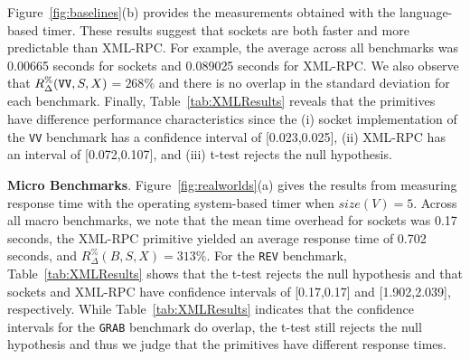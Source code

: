 \documentclass{sig-alternate}
\begin{document}

\sloppy Figure~\ref{fig:baselines}(b) provides the measurements
obtained with the language-based timer.  These results suggest that
sockets are both faster and more predictable than XML-RPC.  For
example, the average across all benchmarks was 0.00665 seconds for
sockets and 0.089025 seconds for XML-RPC.  We also observe that
{\small $R_\Delta^\%(\mbox{{\tt VV}},S,X)$}$=268\%$ and there is no
overlap in the standard deviation for each benchmark.  Finally,
Table~\ref{tab:XMLResults} reveals that the primitives have difference
performance characteristics since the (i) socket implementation of the
\texttt{VV} benchmark has a confidence interval of [0.023,0.025], (ii)
XML-RPC has an interval of [0.072,0.107], and (iii) t-test rejects the
null hypothesis.








{\bf Micro Benchmarks}. Figure~\ref{fig:realworlds}(a) gives the
results from measuring response time with the operating system-based
timer when $size(V) = 5$.  Across all macro benchmarks, we note that
the mean time overhead for sockets was 0.17 seconds, the XML-RPC
primitive yielded an average response time of 0.702 seconds, and
{\small $R_\Delta^\%(B,S,X)$}$=313\%$.  For the \texttt{REV}
benchmark, Table~\ref{tab:XMLResults} shows that the t-test rejects
the null hypothesis and that sockets and XML-RPC have confidence
intervals of [0.17,0.17] and [1.902,2.039], respectively.  While
Table~\ref{tab:XMLResults} indicates that the confidence intervals for
the {\tt GRAB} benchmark do overlap, the t-test still rejects the null
hypothesis and thus we judge that the primitives have different
response times.
\end{document}
